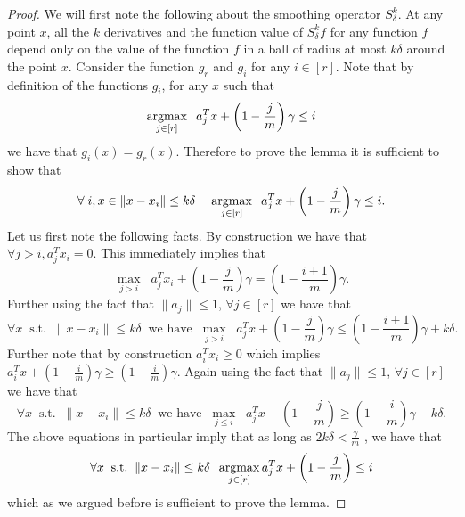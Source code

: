 \documentclass[final,12pt]{colt2018} %
\begin{document}
\begin{proof}
  

We will first note the following about the smoothing operator $S^k_{\delta}$. At any point $x$, all the $k$ derivatives and the function value of $S^k_{\delta} f$ for any function $f$ depend only on the value of the function $f$ in a ball of radius at most $k \delta$ around the point $x$. Consider the function $g_r$ and $g_i$ for any $i \in [r]$. Note that by definition of the functions $g_i$, for any $x$ such that \[
\operatorname*{argmax}_{j \in [r]} \;\;a_j^Tx + \left(1 - \frac{j}{m}\right)\gamma \leq i\]
we have that $g_i(x) = g_r(x)$. Therefore to prove the lemma it is sufficient to show that
\[ \forall \;i, x \in \|x - x_i\| \leq k\delta\;\;\;\; \operatorname*{argmax}_{j \in [r]} \;\;a_j^Tx + \left(1 - \frac{j}{m}\right)\gamma \leq i.\]
Let us first note the following facts. By construction we have that $\forall j > i, a_j^Tx_i = 0$. This immediately implies that  
\begin{equation}
\max_{j > i} \;\; a_j^Tx_i + \left(1 - \frac{j}{m}\right)\gamma =\left(1 - \frac{i+1}{m} \right) \gamma.
\end{equation}
Further using the fact that $\|a_j\| \leq 1$, $\forall j \in [r]$ we have that 
\begin{equation}
\forall x \;\;\text{s.t.}\;\;\|x - x_i\| \leq k\delta \;\;\text{we have}\;\; \max_{j > i} \;\; a_j^Tx + \left(1 - \frac{j}{m}\right)\gamma \leq\left(1 - \frac{i+1}{m} \right) \gamma + k\delta.
\end{equation}
Further note that by construction $a_i^Tx_i \geq 0$ which implies $a_i^Tx + \left(1 - \frac{i}{m}\right)\gamma \geq \left(1 - \frac{i}{m} \right)\gamma$. Again using the fact that $\|a_j\| \leq 1$, $\forall j \in [r]$ we have that 
\begin{equation}
\label{eqn:templabel1}
\forall x \;\;\text{s.t.}\;\;\|x - x_i\| \leq k\delta \;\;\text{we have}\;\; \max_{j \leq i} \;\; a_j^Tx + \left(1 - \frac{j}{m}\right) \geq \left(1 - \frac{i}{m} \right) \gamma - k\delta.
\end{equation}
The above equations in particular imply that as long as $2k\delta < \frac{\gamma}{m}$ , we have that  
\begin{equation}
\forall x \;\;\text{s.t.}\;\;\|x - x_i\| \leq k\delta \;\; \operatorname*{argmax}_{j \in [r]} a_j^Tx + \left(1 - \frac{j}{m}\right) \leq i 
\end{equation}
which as we argued before is sufficient to prove the lemma.
\end{proof}
\end{document}
